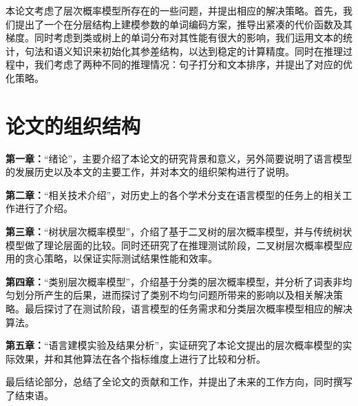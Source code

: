 本论文考虑了层次概率模型所存在的一些问题，并提出相应的解决策略。首先，我们提出了一个在分层结构上建模参数的单词编码方案，推导出紧凑的代价函数及其梯度。同时考虑到类或树上的单词分布对其性能有很大的影响，我们运用文本的统计，句法和语义知识来初始化其参差结构，以达到稳定的计算精度。同时在推理过程中，我们考虑了两种不同的推理情况：句子打分和文本排序，并提出了对应的优化策略。
\section{论文的组织结构}
\textbf{第一章：}``绪论''，主要介绍了本论文的研究背景和意义，另外简要说明了语言模型的发展历史以及本文的主要工作，并对本文的组织架构进行了说明。

\textbf{第二章：}``相关技术介绍''，对历史上的各个学术分支在语言模型的任务上的相关工作进行了介绍。

\textbf{第三章：}``树状层次概率模型''，介绍了基于二叉树的层次概率模型，并与传统树状模型做了理论层面的比较。同时还研究了在推理测试阶段，二叉树层次概率模型应用的贪心策略，以保证实际测试结果性能和效率。

\textbf{第四章：}``类别层次概率模型''，介绍基于分类的层次概率模型，并分析了词表非均匀划分所产生的后果，进而探讨了类别不均匀问题所带来的影响以及相关解决策略。最后探讨了在测试阶段，语言模型的任务需求和分类层次概率模型相应的解决算法。

\textbf{第五章：}``语言建模实验及结果分析''，实证研究了本论文提出的层次概率模型的实际效果，并和其他算法在各个指标维度上进行了比较和分析。

最后结论部分，总结了全论文的贡献和工作，并提出了未来的工作方向，同时撰写了结束语。



